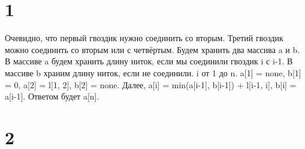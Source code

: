 \documentclass{extarticle}
\begin{document}
\section*{1}
Очевидно, что первый гвоздик нужно соединить со вторым.
Третий гвоздик можно соединить со вторым или с четвёртым. Будем хранить два массива a и b. В массиве a будем хранить длину ниток, если мы соединили гвоздик i с i-1. В массиве b храним длину ниток, если не соединили. i от 1 до n. a[1] = none, b[1] = 0, a[2] = l[1, 2], b[2] = none. Далее, a[i] = min(a[i-1], b[i-1]) + l[i-1, i], b[i] = a[i-1]. Ответом будет a[n].

\section*{2}
\end{document}
